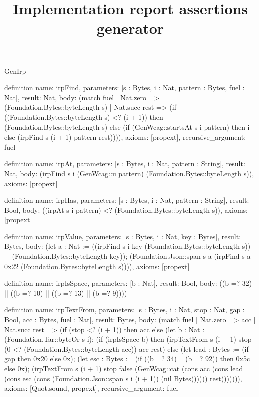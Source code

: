 \begin{lexlean}{GenIrp}
\title{Implementation report assertions generator}
\begin{semanticmodule}
definition{
  name: irpFind,
  parameters: [s : Bytes, i : Nat, pattern : Bytes, fuel : Nat],
  result: Nat,
  body: (match fuel
    | Nat.zero => (Foundation.Bytes::byteLength s)
    | Nat.succ rest => (if ((Foundation.Bytes::byteLength s) <? (i + 1)) then (Foundation.Bytes::byteLength s) else (if (GenWcag::startsAt s i pattern) then i else (irpFind s (i + 1) pattern rest)))),
  axioms: [propext],
  recursive_argument: fuel
}

definition{
  name: irpAt,
  parameters: [s : Bytes, i : Nat, pattern : String],
  result: Nat,
  body: (irpFind s i (GenWcag::u pattern) (Foundation.Bytes::byteLength s)),
  axioms: [propext]
}

definition{
  name: irpHas,
  parameters: [s : Bytes, i : Nat, pattern : String],
  result: Bool,
  body: ((irpAt s i pattern) <? (Foundation.Bytes::byteLength s)),
  axioms: [propext]
}

definition{
  name: irpValue,
  parameters: [s : Bytes, i : Nat, key : Bytes],
  result: Bytes,
  body: (let a : Nat := ((irpFind s i key (Foundation.Bytes::byteLength s)) + (Foundation.Bytes::byteLength key)); (Foundation.Json::span s a (irpFind s a 0x22 (Foundation.Bytes::byteLength s)))),
  axioms: [propext]
}

definition{
  name: irpIsSpace,
  parameters: [b : Nat],
  result: Bool,
  body: ((b =? 32) || ((b =? 10) || ((b =? 13) || (b =? 9))))
}

definition{
  name: irpTextFrom,
  parameters: [s : Bytes, i : Nat, stop : Nat, gap : Bool, acc : Bytes, fuel : Nat],
  result: Bytes,
  body: (match fuel
    | Nat.zero => acc
    | Nat.succ rest => (if (stop <? (i + 1)) then acc else (let b : Nat := (Foundation.Tar::byteOr s i); (if (irpIsSpace b) then (irpTextFrom s (i + 1) stop (0 <? (Foundation.Bytes::byteLength acc)) acc rest) else (let lead : Bytes := (if gap then 0x20 else 0x); (let esc : Bytes := (if ((b =? 34) || (b =? 92)) then 0x5c else 0x); (irpTextFrom s (i + 1) stop false (GenWcag::cat (cons acc (cons lead (cons esc (cons (Foundation.Json::span s i (i + 1)) (nil Bytes)))))) rest))))))),
  axioms: [Quot.sound, propext],
  recursive_argument: fuel
}


\end{semanticmodule}
\end{lexlean}

